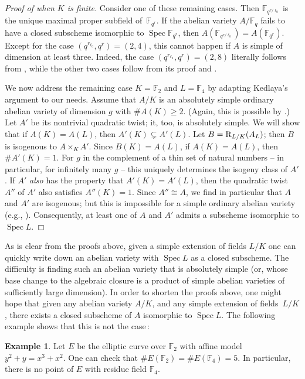 \documentclass[11pt, reqno]{amsart}
\numberwithin{equation}{section}
\theoremstyle{definition}
\newtheorem{exa}[teo]{Example}
\theoremstyle{remark}
\def\res{{\bf\rm R}}
\def\ff{{\mathbb F}}
\def\iso{\cong}
\DeclareMathOperator{\spec}{Spec}
\begin{document}
\begin{proof}[Proof of  when $K$ is finite]
Consider one of these remaining cases.  Then $\ff_{q^{r/\ell_0}}$ is
the unique maximal proper subfield of~$\ff_{q^r}$.  If the abelian
variety $A/\ff_q$ fails to have a closed subscheme isomorphic to
$\spec \ff_{q^r}$, then $A(\ff_{q^{r/\ell_0}}) = A(\ff_{q^{r}})$.
Except for the case $(q^{r_{\ell_0}},q^r) = (2,4)$, this cannot happen
if $A$ is simple of dimension at least three.  Indeed, the case
$(q^{r_{\ell_0}},q^r) = (2,8)$ literally follows from
\cite[Lem.~3.1]{kedlayarelclassoneI}, while the other two cases follow
from its proof and \cite[Lem.~2.1(b)]{kedlayarelclassoneI}.  

We now
address the remaining case $K = \ff_2$ and $L= \ff_4$ by adapting
Kedlaya's argument to our needs.  Assume that $A/K$ is an absolutely simple ordinary
abelian variety of dimension $g$ with $\#A(K) \ge 2$.  (Again, this is
possible by \cite{howezhu02}.)  Let $A'$ be its nontrivial quadratic
twist; it, too, is absolutely simple.  We will show that if $A(K) =
A(L)$, then $A'(K) \subsetneq A'(L)$.  Let $B = \res_{L/K}(A_L)$; then
$B$ is isogenous to $A\times_K A'$.  Since $B(K) = A(L)$, if $A(K) =
A(L)$, then $\#A'(K)  = 1$.  For $g$ in the complement of a thin set
of natural numbers -- in particular, for infinitely many $g$ -- this uniquely determines the isogeny class of $A'$
\cite[Lem.~2.1(c)]{kedlayarelclassoneI}.   If $A'$ \emph{also} has the
property that $A'(K) = A'(L)$, then the quadratic twist $A''$ of $A'$
also satisfies $A''(K) = 1$.  Since $A'' \iso A$, we find in
particular that $A$ and
$A'$ are isogenous; but this is impossible for a simple ordinary
abelian variety (e.g., \cite[Ex.~1.7]{achtercunningham15}). Consequently, at
least one of $A$ and $A'$
admits a subscheme isomorphic to $\spec L$. 
\end{proof}



As is clear from the proofs above, given a simple extension of fields $L/K$ one can quickly write down an abelian variety with $\operatorname{Spec}L$ as a closed subscheme.  The difficulty is finding such an abelian variety that is absolutely simple (or, whose base change to the algebraic closure is a product of simple abelian varieties of sufficiently large dimension).  In order to shorten the proofs above, one might hope that given any abelian variety $A/K$, and any simple extension of fields~$L/K$, 
there exists a closed subscheme of $A$ isomorphic to $\operatorname{Spec}L$.  The following example shows that this is not the case\,:

\begin{exa}
Let $E$ be the elliptic curve over $\mathbb F_2$ with affine model $y^2+y = x^3+x^2$.  One can check that $\#E(\mathbb F_2) = \#E(\mathbb F_4)=5$. In particular, there is no point of $E$ with residue field $\mathbb F_4$.
\end{exa}
  
\end{document}
